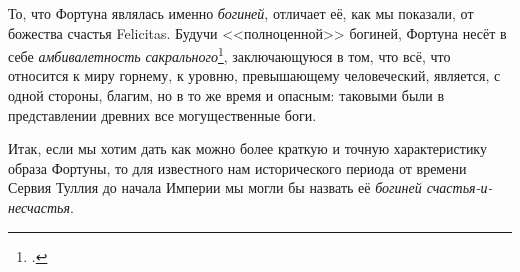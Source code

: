 То, что Фортуна являлась именно \textit{богиней}, отличает её, как мы показали, от божества счастья Felicitas. Будучи <<полноценной>> богиней, Фортуна несёт в себе \textit{амбивалетность сакрального}\footcite[С. 29--33]{Eliade1999}, заключающуюся в том, что всё, что относится к миру горнему, к уровню, превышающему человеческий, является, с одной стороны, благим, но в то же время и опасным: таковыми были в представлении древних все могущественные боги.

Итак, если мы хотим дать как можно более краткую и точную характеристику образа Фортуны, то для известного нам исторического периода от времени Сервия Туллия до начала Империи мы могли бы назвать её \textit{богиней счастья-и-несчастья}.

